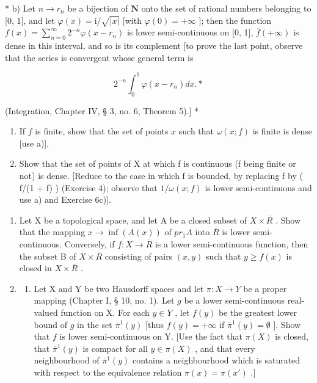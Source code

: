 * b) Let \(n \to r_n\) be a bijection of \(\mathbf{N}\) onto the set of rational numbers belonging to {[}0, 1{]}, and let \(\varphi(x) = \mathrm{i}/\sqrt{|x|}\) {[}with \(\varphi(0) = +\infty\) {]}; then the function \(f(x) = \sum_{n=0}^{\infty} 2^{-n} \varphi(x - r_n)\) is lower semi-continuous on {[}0, 1{]}, \(\overline{f}(+\infty)\) is dense in this interval, and so is its complement {[}to prove the last point, observe that the series is convergent whose general term is

\[
2 ^ {- n} \int_ {0} ^ {1} \varphi (x - r _ {n}) d x. *
\]

(Integration, Chapter IV, § 3, no. 6, Theorem 5).{]} *

\begin{enumerate}
\def\labelenumi{\alph{enumi})}
\setcounter{enumi}{2}
\item
  If \(f\) is finite, show that the set of points \(x\) such that \(\omega(x; f)\) is finite is dense {[}use a){]}.
\item
  Show that the set of points of X at which f is continuous (f being finite or not) is dense. {[}Reduce to the case in which f is bounded, by replacing f by ( f/(1 + \textbar f\textbar) ) (Exercise 4); observe that \(1/\omega(x; f)\) is lower semi-continuous and use a) and Exercise 6c){]}.
\end{enumerate}

\begin{enumerate}
\def\labelenumi{\arabic{enumi})}
\setcounter{enumi}{7}
\item
  Let X be a topological space, and let A be a closed subset of \(X \times \overline{R}\) . Show that the mapping \(x \to \inf(A(x))\) of \(pr_{1}A\) into \(\overline{R}\) is lower semi-continuous. Conversely, if \(f: X \to \overline{R}\) is a lower semi-continuous function, then the subset B of \(X \times \overline{R}\) consisting of pairs \((x, y)\) such that \(y \geqslant f(x)\) is closed in \(X \times \overline{R}\) .
\item
  \begin{enumerate}
  \def\labelenumii{\alph{enumii})}
  \tightlist
  \item
    Let X and Y be two Hausdorff spaces and let \(\pi: X \to Y\) be a proper mapping (Chapter I, § 10, no. 1). Let \(g\) be a lower semi-continuous real-valued function on X. For each \(y \in Y\) , let \(f(y)\) be the greatest lower bound of \(g\) in the set \(\overline{\pi}^{1}(y)\) {[}thus \(f(y) = +\infty\) if \(\overline{\pi}^{1}(y) = \emptyset\) {]}. Show that \(f\) is lower semi-continuous on Y. {[}Use the fact that \(\pi(X)\) is closed, that \(\overline{\pi}^{1}(y)\) is compact for all \(y \in \pi(X)\) , and that every neighbourhood of \(\overline{\pi}^{1}(y)\) contains a neighbourhood which is saturated with respect to the equivalence relation \(\pi(x) = \pi(x')\) .{]}
  \end{enumerate}
\end{enumerate}

